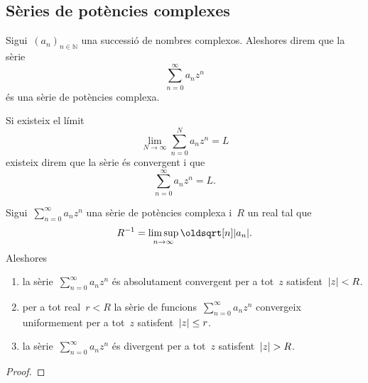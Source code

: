 \documentclass[../Apunts.tex]{subfiles}
\begin{document}
	\subsection{Sèries de potències complexes}
	\begin{definition}
		\label{def:sèrie de potències complexes}
		Sigui~\((a_{n})_{n\in\mathbb{N}}\) una successió de nombres complexos.
		Aleshores direm que la sèrie
		\[\sum_{n=0}^{\infty}a_{n}z^{n}\]
		és una sèrie de potències complexa.
		
		Si existeix el límit
		\[\lim_{N\to\infty}\sum_{n=0}^{N}a_{n}z^{n}=L\]
		existeix direm que la sèrie és convergent i que
		\[\sum_{n=0}^{\infty}a_{n}z^{n}=L.\]
		
	\end{definition}
	\begin{theorem}
		\label{thm:radi de convergència d'una sèrie de potències complexa}
		Sigui~\(\sum_{n=0}^{\infty}a_{n}z^{n}\) una sèrie de potències complexa
		i~\(R\) un real tal que
		\[R^{-1}=\limsup_{n\to\infty}\sqrt[n]{\modul{a_{n}}}.\]
		Aleshores
		\begin{enumerate}
			\item\label{thm:radi de convergència d'una sèrie de potències complexa:enum1}
				la sèrie~\(\sum_{n=0}^{\infty}a_{n}z^{n}\) és absolutament
				convergent per a tot~\(z\) satisfent~\(\modul{z}<R\).
			\item\label{thm:radi de convergència d'una sèrie de potències complexa:enum2}
				per a tot real~\(r<R\) la sèrie de
				funcions~\(\sum_{n=0}^{\infty}a_{n}z^{n}\) convergeix
				uniformement per a tot~\(z\) satisfent~\(\modul{z}\leq r\).
			\item\label{thm:radi de convergència d'una sèrie de potències complexa:enum3}
				la sèrie~\(\sum_{n=0}^{\infty}a_{n}z^{n}\) és divergent per a
				tot~\(z\) satisfent~\(\modul{z}>R\).
		\end{enumerate}
	\end{theorem}
	\begin{proof}
	\end{proof}
\end{document}
